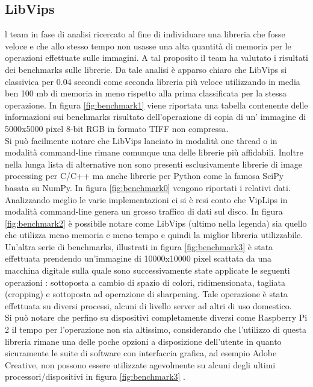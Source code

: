 \documentclass[10pt]{article}
\begin{document}
\subsection{LibVips}
l team in fase di analisi ricercato al fine di individuare una libreria che fosse veloce e che allo stesso tempo non usasse una alta quantità di memoria per le operazioni effettuate sulle immagini. A tal proposito il team ha valutato i risultati dei benchmarks sulle librerie. Da tale analisi è apparso chiaro che LibVips si classivica per 0.04 secondi come seconda libreria più veloce utilizzando in media ben 100 mb di memoria in meno rispetto alla prima classificata per la stessa operazione. In figura \ref{fig:benchmark1} viene riportata una tabella contenente delle informazioni sui benchmarks risultato dell'operazione di copia di un' immagine di 5000x5000 pixel 8-bit RGB in formato TIFF non compressa.\\
Si può facilmente notare che LibVips lanciato in modalità one thread o in modalità command-line rimane comunque una delle librerie più affidabili. Inoltre nella lunga lista di alternative non sono presenti esclusivamente librerie di image processing per C/C++ ma anche librerie per Python come la famosa SciPy basata su NumPy. In figura \ref{fig:benchmark0} vengono riportati i relativi dati.\\
Analizzando meglio le varie implementazioni ci si è resi conto che VipLips in modalità command-line genera un grosso traffico di dati sul disco. In figura \ref{fig:benchmark2} è possibile notare come LibVips (ultimo nella legenda) sia quello che utilizza meno memoria e meno tempo e quindi la miglior libreria utilizzabile.\\
Un’altra serie di benchmarks, illustrati in figura \ref{fig:benchmark3}  è stata effettuata prendendo un’immagine di 10000x10000 pixel scattata da una macchina digitale sulla quale sono successivamente state applicate le seguenti operazioni : sottoposta a cambio di spazio di colori, ridimensionata, tagliata (cropping) e sottoposta ad operazione di sharpening. Tale operazione è stata effettuata su diversi processi, alcuni di livello server ad altri di uso domestico.\\
Si può notare che perfino su dispositivi completamente diversi come Raspberry Pi 2 il tempo per l’operazione non sia altissimo, considerando che  l’utilizzo di questa libreria rimane una delle poche opzioni a disposizione dell’utente in quanto sicuramente le suite di software con interfaccia grafica, ad esempio Adobe Creative, non possono essere utilizzate agevolmente su alcuni degli ultimi processori/dispositivi in figura \ref{fig:benchmark3} .\clearpage
\end{document}
